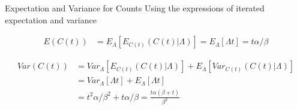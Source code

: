 \documentclass[english]{beamer}\usepackage[]{graphicx}\usepackage[]{xcolor}
\begin{document}
\begin{frame}{Expectation and Variance for Counts}
Using the expressions of iterated expectation and variance \citep{held2014applied}

\begin{align*}
E(C(t)) &= E_{\Lambda}[E_{C(t)} (C(t)|\Lambda)] = E_{\Lambda}[\Lambda t] = t\alpha/\beta
\end{align*}

\begin{align*}
Var(C(t)) &= Var_{\Lambda}[E_{C(t)} (C(t)|\Lambda)] + E_{\Lambda}[Var_{C(t)}(C(t)|\Lambda)]\\
&=Var_{\Lambda}[\Lambda t] + E_{\Lambda}[\Lambda t] \\
&=t^2\alpha/\beta^2 + t\alpha/\beta = \frac{t \alpha(\beta+t)}{\beta^2}
\end{align*}
\end{frame}
\end{document}
